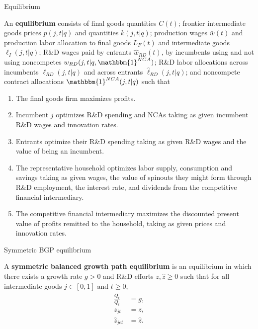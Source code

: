\documentclass[english,usenames,dvipsnames]{beamer}
\begin{document}
\begin{frame}{Equilibrium}\label{definition:equilibrium}
	\hyperlink{model:firm_ownership}{}
\begin{definition}
	\tiny
	An \textbf{equilibrium} consists of final goods quantities $C(t)$; frontier intermediate goods prices $p(j,t|q)$ and quantities $k(j,t|q)$; production wages $\bar{w}(t)$ and production labor allocation to final goods $L_{F}(t)$ and intermediate goods $\ell_I(j,t|q)$; R\&D wages paid by entrants $\hat{w}_{RD}(t)$, by incumbents using and not using noncompetes $w_{RD}(j,t|q,\mathbbm{1}^{NCA})$; R\&D labor allocations across incumbents $\ell_{RD}(j,t|q)$ and across entrants $\hat{\ell}_{RD}(j,t|q)$; and noncompete contract allocations $\mathbbm{1}^{NCA}(j,t|q)$ such that 
	\begin{enumerate}
		\item The final goods firm maximizes profits.
		\item Incumbent $j$ optimizes R\&D spending and NCAs taking as given incumbent R\&D wages and innovation rates.
		\item Entrants optimize their R\&D spending taking as given R\&D wages and the value of being an incumbent.
		\item The representative household optimizes labor supply, consumption and savings taking as given wages, the value of spinouts they might form through R\&D employment, the interest rate, and dividends from the competitive financial intermediary.
		\item The competitive financial intermediary maximizes the discounted present value of profits remitted to the household, taking as given prices and innovation rates.
	\end{enumerate}
\end{definition}
\end{frame}

\begin{frame}{Symmetric BGP equilibrium}\label{definition:symmetric_bgp}
	\hyperlink{characterizing_BGP}{}
	\begin{definition}
		A \textbf{symmetric balanced growth path equilibrium} is an equilibrium in which there exists a growth rate $g > 0$ and R\&D efforts $z,\hat{z} \ge 0$ such that for all intermediate goods $j \in [0,1]$ and $t \ge 0$, 
		\begin{align*}
			\frac{\dot{Q}_t}{Q_t} &= g, \\
			z_{jt} &= z, \\
			\hat{z}_{jet} &= \hat{z}.
		\end{align*}
	\end{definition}
\end{frame}
\end{document}
